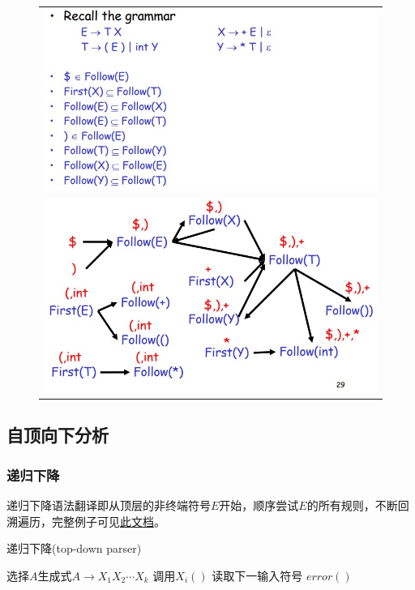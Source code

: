 \begin{figure}[H]
\centering
\begin{tabular}{c}
\includegraphics[width=0.8\linewidth]{fig/follow_eg1.jpg}\\
\includegraphics[width=0.8\linewidth]{fig/follow_eg2.jpg}
\end{tabular}
\end{figure}

\subsection{自顶向下分析}
\subsubsection{递归下降}
递归下降语法翻译即从顶层的非终端符号$E$开始，顺序尝试$E$的所有规则，不断回溯遍历，完整例子可见\href{http://web.stanford.edu/class/cs143/lectures/lecture06.pdf}{此文档}。

\begin{algorithm}[H]
\centering
\caption{递归下降(top-down parser)}
\begin{algorithmic}[1]
\State 选择$A$生成式$A\to X_1X_2\cdots X_k$
\State 调用$X_i()$
\Else{}
\State 读取下一输入符号
\Else
\State $error()$
\EndIf
\EndIf
\EndFor
\end{algorithmic}
\end{algorithm}

